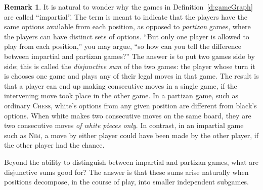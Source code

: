 \documentclass[12pt]{amsart}
\numberwithin{equation}{section}
\theoremstyle{definition}
\newtheorem{remark}[thm]{Remark}
\begin{document}
\begin{remark}\label{r:impartial}
It is natural to wonder why the games in Definition~\ref{d:gameGraph}
are called ``impartial''.  The term is meant to indicate that the
players have the same options available from each position, as opposed
to \emph{partizan} games, where the players can have distinct sets of
options.  ``But only one player is allowed to play from each
position,'' you may argue, ``so how can you tell the difference
between impartial and partizan games?''  The answer is to put two
games side by side; this is called the \emph{disjunctive sum} of the
two games: the player whose turn it is chooses one game and plays any
of their legal moves in that game.  The result is that a player can
end up making consecutive moves in a single game, if the intervening
move took place in the other game.  In a partizan game, such as
ordinary {\textsc{Chess}}, white's options from any given position are different
from black's options.  When white makes two consecutive moves on the
same board, they are two consecutive moves \emph{of white pieces
only}.  In contrast, in an impartial game such as {\textsc{Nim}}, a move by
either player could have been made by the other player, if the other
player had the chance.
\end{remark}

Beyond the ability to distinguish between impartial and partizan
games, what are disjunctive sums good for?  The answer is that these
sums arise naturally when positions decompose, in the course of play,
into smaller independent subgames.
\end{document}
